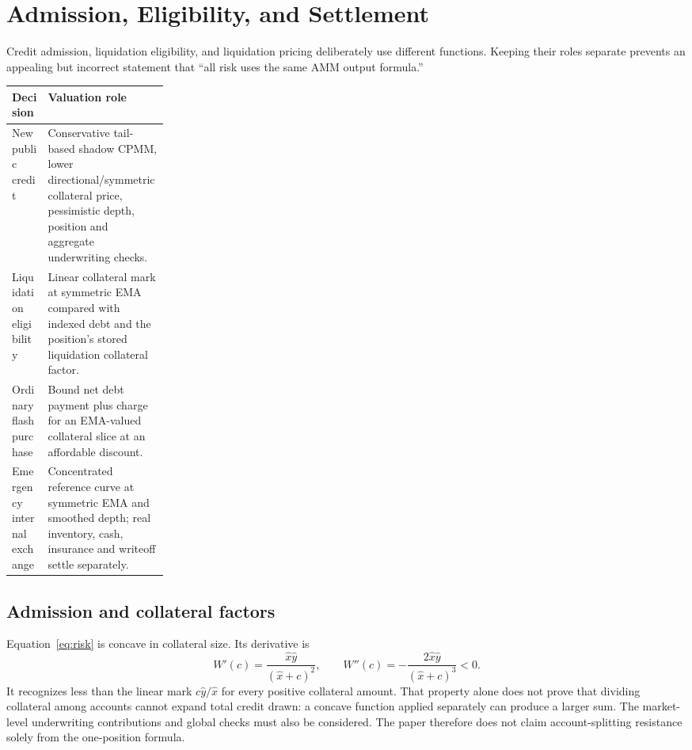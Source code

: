\section{Admission, Eligibility, and Settlement}
\label{app:credit}

Credit admission, liquidation eligibility, and liquidation pricing deliberately use different functions. Keeping their roles separate prevents an appealing but incorrect statement that ``all risk uses the same AMM output formula.''
\begin{center}\small
\begin{tabularx}{\linewidth}{@{}>{\raggedright\arraybackslash}p{0.23\linewidth}>{\raggedright\arraybackslash}X@{}}
\toprule
Decision & Valuation role \\
\midrule
New public credit & Conservative tail-based shadow CPMM, lower directional/symmetric collateral price, pessimistic depth, position and aggregate underwriting checks. \\
Liquidation eligibility & Linear collateral mark at symmetric EMA compared with indexed debt and the position's stored liquidation collateral factor. \\
Ordinary flash purchase & Bound net debt payment plus charge for an EMA-valued collateral slice at an affordable discount. \\
Emergency internal exchange & Concentrated reference curve at symmetric EMA and smoothed depth; real inventory, cash, insurance and writeoff settle separately. \\
\bottomrule
\end{tabularx}\end{center}

\subsection{Admission and collateral factors}

Equation~\eqref{eq:risk} is concave in collateral size. Its derivative is
\[
W'(c)=\frac{\widehat x\widehat y}{(\widehat x+c)^2},\qquad
W''(c)=-\frac{2\widehat x\widehat y}{(\widehat x+c)^3}<0.
\]
It recognizes less than the linear mark $c\widehat y/\widehat x$ for every positive collateral amount. That property alone does not prove that dividing collateral among accounts cannot expand total credit drawn: a concave function applied separately can produce a larger sum. The market-level underwriting contributions and global checks must also be considered. The paper therefore does not claim account-splitting resistance solely from the one-position formula.

